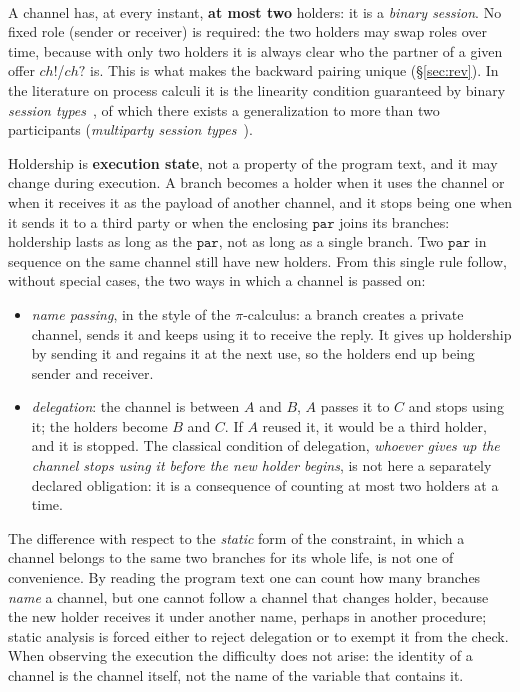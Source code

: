 \paragraph{} A channel has,
at every instant, \textbf{at most two} holders: it is a \emph{binary session}.
No fixed role (sender or receiver) is required: the two holders may
swap roles over time, because with only two holders it is always clear who
the partner of a given offer $\mathit{ch}!$/$\mathit{ch}?$ is. This is what
makes the backward pairing unique (\S\ref{sec:rev}). In the literature
on process calculi it is the linearity condition guaranteed by binary \emph{session
types}~\cite{HondaVasconcelosKubo1998}, of which there exists a generalization
to more than two participants (\emph{multiparty session
types}~\cite{HondaYoshidaCarbone2008}).

\medskip
\noindent
Holdership is \textbf{execution state}, not a property of the program
text, and it may change during execution. A branch becomes a holder when it
uses the channel or when it receives it as the payload of another channel, and it stops
being one when it sends it to a third party or when the enclosing
$\mathtt{par}$ joins its branches: holdership lasts as long as the
$\mathtt{par}$, not as long as a single branch. Two $\mathtt{par}$ in sequence
on the same channel still have new holders. From this single rule follow, without
special cases, the two ways in which a channel is passed on:

\begin{itemize}
\item \emph{name passing}, in the style of the $\pi$-calculus: a branch creates a private
channel, sends it and keeps using it to receive the reply. It gives up
holdership by sending it and regains it at the next use, so the holders
end up being sender and receiver.
\item \emph{delegation}: the channel is between $A$ and $B$, $A$ passes it to $C$ and stops
using it; the holders become $B$ and $C$. If $A$ reused it, it would be a third
holder, and it is stopped. The classical condition of delegation, \emph{whoever gives
up the channel stops using it before the new holder begins}, is not here a separately
declared obligation: it is a consequence of counting at most two holders at a time.
\end{itemize}

\noindent
The difference with respect to the \emph{static} form of the constraint, in which a channel
belongs to the same two branches for its whole life, is not one of convenience. By reading the
program text one can count how many branches \emph{name} a channel, but one
cannot follow a channel that changes holder, because the new holder receives it
under another name, perhaps in another procedure; static analysis is forced
either to reject delegation or to exempt it from the check. When observing the execution the
difficulty does not arise: the identity of a channel is the channel itself, not the
name of the variable that contains it.

